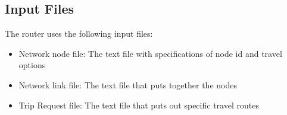 \documentclass[English]{article}
\theoremstyle{remark}
\numberwithin{equation}{section}
\begin{document}


\subsection{Input Files}
\label{sec:inputfiles}

The router uses the following input files:
\begin{itemize}
\item Network node file: The text file with specifications of node id and travel options
\item Network link file: The text file that puts together the nodes
\item Trip Request file: The text file that puts out specific travel routes
\end{itemize}
\end{document}
